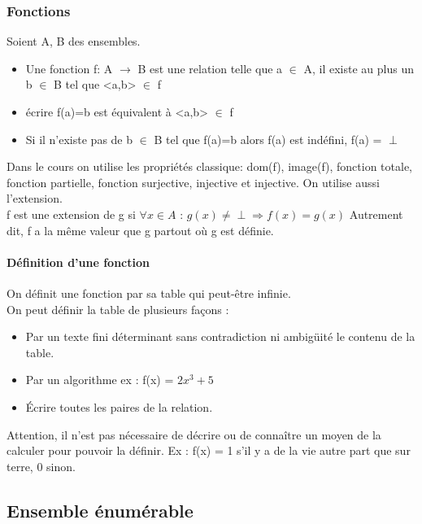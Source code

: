 \documentclass[11pt,a4paper]{article}
\begin{document}

\subsubsection{Fonctions}
\label{ssub:fonctions}
Soient A, B des ensembles.
\begin{itemize}
	\item Une fonction f: A $\rightarrow$ B est une relation telle que a $\in$
	A, il existe au plus un b $\in$ B tel que <a,b> $\in$ f
	\item écrire f(a)=b est équivalent à <a,b> $\in$ f
	\item Si il n'existe pas de b $\in$ B tel que f(a)=b alors f(a) est indéfini,
		f(a) = $\perp$
\end{itemize}

Dans le cours on utilise les propriétés classique: dom(f), image(f), fonction totale,
fonction partielle, fonction surjective, injective et injective. On utilise aussi 
l'extension. \\
f est une extension de g si $\forall x \in A$ : $g(x)\neq \perp \Rightarrow f(x) = g(x)$
Autrement dit, f a la même valeur que g partout où g est définie.

\paragraph{Définition d'une fonction}
\label{par:d_finition_d_une_fonciton}
On définit une fonction par sa table qui peut-être infinie.\\
On peut définir la table de plusieurs façons :
\begin{itemize}
	\item Par un texte fini déterminant sans contradiction ni ambigüité le contenu
		de la table.
	\item Par un algorithme ex : f(x) = $2x^3+5$
	\item Écrire toutes les paires de la relation.
\end{itemize}
Attention, il n'est pas nécessaire de décrire ou de connaître un moyen de la calculer
pour pouvoir la définir. Ex : f(x) = 1 s'il y a de la vie autre part que sur terre,
0 sinon.

\subsection{Ensemble énumérable}
\label{sub:ensemble_num_rables}
\end{document}
